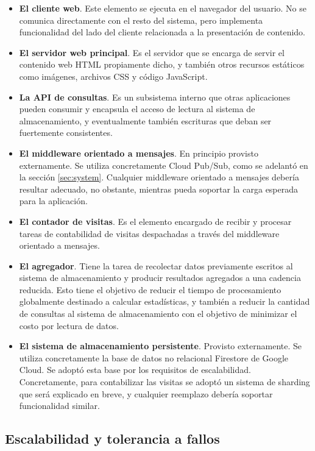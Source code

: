 \documentclass[11pt]{scrartcl}
\begin{document}
\begin{itemize}
\item \textbf{El cliente web}. Este elemento se ejecuta en el navegador del usuario. No se comunica directamente con el resto del sistema, pero implementa funcionalidad del lado del cliente relacionada a la presentación de contenido.
\item \textbf{El servidor web principal}. Es el servidor que se encarga de servir el contenido web HTML propiamente dicho, y también otros recursos estáticos como imágenes, archivos CSS y código JavaScript.
\item \textbf{La API de consultas}. Es un subsistema interno que otras aplicaciones pueden consumir y encapsula el acceso de lectura al sistema de almacenamiento, y eventualmente también escrituras que deban ser fuertemente consistentes.
\item \textbf{El middleware orientado a mensajes}. En principio provisto externamente. Se utiliza concretamente Cloud Pub/Sub, como se adelantó en la sección \ref{sec:system}. Cualquier middleware orientado a mensajes debería resultar adecuado, no obstante, mientras pueda soportar la carga esperada para la aplicación.
\item \textbf{El contador de visitas}. Es el elemento encargado de recibir y procesar tareas de contabilidad de visitas despachadas a través del middleware orientado a mensajes.
\item \textbf{El agregador}. Tiene la tarea de recolectar datos previamente escritos al sistema de almacenamiento y producir resultados agregados a una cadencia reducida. Esto tiene el objetivo de reducir el tiempo de procesamiento globalmente destinado a calcular estadísticas, y también a reducir la cantidad de consultas al sistema de almacenamiento con el objetivo de minimizar el costo por lectura de datos.
\item \textbf{El sistema de almacenamiento persistente}. Provisto externamente. Se utiliza concretamente la base de datos no relacional Firestore de Google Cloud. Se adoptó esta base por los requisitos de escalabilidad. Concretamente, para contabilizar las visitas se adoptó un sistema de sharding que será explicado en breve, y cualquier reemplazo debería soportar funcionalidad similar.
\end{itemize}

\subsection{Escalabilidad y tolerancia a fallos}
\end{document}
